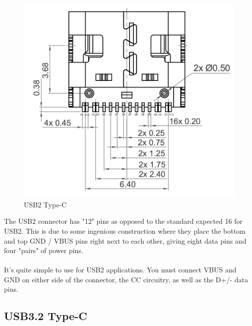 \documentclass[12pt]{article}
\begin{document}
\begin{figure}[h]
	\centering
	\includegraphics[width=.8\linewidth]{GCT-USB2-Type-C.png}
	\caption{USB2 Type-C\protect\footnotemark}
	\label{fig:usb-c-pinout-usb2-gct}
\end{figure}


\noindent
The USB2 connector has "12" pins as opposed to the standard expected 16 for USB2. This is due to some ingenious construction where they place the bottom and top GND / VBUS pins right next to each other, giving eight data pins and four "pairs" of power pins.\\\\
\noindent
It's quite simple to use for USB2 applications. You must connect VBUS and GND on either side of the connector, the CC circuitry, as well as the D+/- data pins.



\newpage

\subsection{USB3.2 Type-C}
\end{document}
